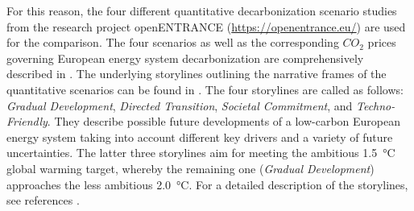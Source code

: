 \documentclass[review]{elsarticle}
\begin{document}
For this reason, the four different quantitative decarbonization scenario studies from the research project {openENTRANCE} (\url{https://openentrance.eu/}) are used for the comparison. The four scenarios as well as the corresponding $CO_2$ prices governing European energy system decarbonization are comprehensively described in \cite{auer2020development, auer2020quantitative}. The underlying storylines outlining the narrative frames of the quantitative scenarios can be found in \cite{auer2019quantitative}. The four storylines are called as follows: \textit{Gradual Development}, \textit{Directed Transition}, \textit{Societal Commitment}, and \textit{Techno-Friendly}. They describe possible future developments of a low-carbon European energy system taking into account different key drivers and a variety of future uncertainties. The latter three storylines aim for meeting the ambitious \SI{1.5}{\degreeCelsius} global warming target, whereby the remaining one (\textit{Gradual Development}) approaches the less ambitious \SI{2.0}{\degreeCelsius}. For a detailed description of the storylines, see references \cite{auer2020development, auer2020quantitative}.\vspace{0.3cm}
\end{document}
